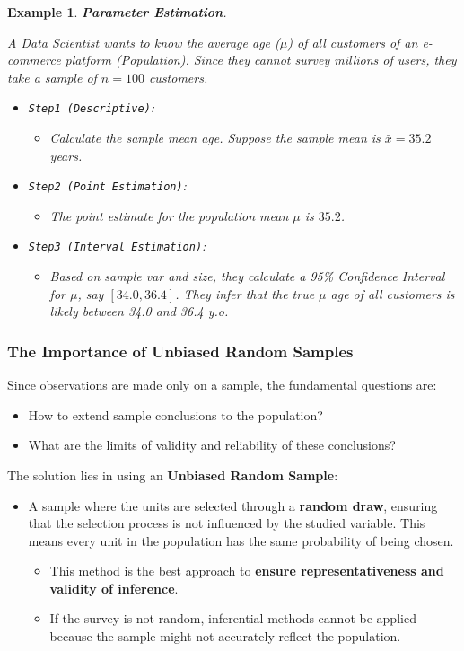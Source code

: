 \documentclass[11pt]{article}
\theoremstyle{smallexample}
\newtheorem{example}{Example}[section]
\begin{document}
\vspace{0.2cm}
\begin{example}{\textbf{Parameter Estimation}}.

A Data Scientist wants to know the average age ($\mu$) of all customers of an e-commerce platform (Population). Since they cannot survey millions of users, they take a sample of $n=100$ customers.
\begin{itemize}
 \item \texttt{Step1 (Descriptive)}:
 \begin{itemize}
     \item Calculate the sample mean age. Suppose the sample mean is $\bar{x} = 35.2$ years.
 \end{itemize}
 \item \texttt{Step2 (Point Estimation)}:
 \begin{itemize}
     \item The point estimate for the population mean $\mu$ is $35.2$.
 \end{itemize}
 \item \texttt{Step3 (Interval Estimation)}:
 \begin{itemize}
     \item Based on sample var and size, they calculate a 95\% Confidence Interval for $\mu$, say $[34.0, 36.4]$. They infer that the true $\mu$ age of \textit{all} customers is likely between 34.0 and 36.4 y.o.
 \end{itemize} 
\end{itemize}
\end{example}

\subsubsection{The Importance of Unbiased Random Samples}

Since observations are made only on a sample, the fundamental questions are:
\begin{itemize}[label=-]
 \item How to extend sample conclusions to the population?
 \item What are the limits of validity and reliability of these conclusions?
\end{itemize}

The solution lies in using an \textbf{Unbiased Random Sample}:

\begin{itemize}
\item  A sample where the units are selected through a \textbf{random draw}, ensuring that the selection process is not influenced by the studied variable. This means every unit in the population has the same probability of being chosen.
\begin{itemize}
    \item This method is the best approach to \textbf{ensure representativeness and validity of inference}.
    \item If the survey is not random, inferential methods cannot be applied because the sample might not accurately reflect the population.
\end{itemize}
\end{itemize}
\end{document}
